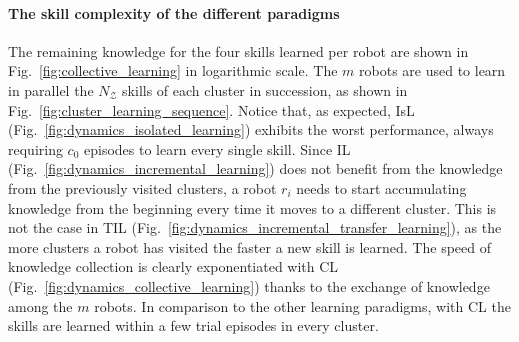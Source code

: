 \documentclass[12pt]{article}
\begin{document}
\paragraph*{The skill complexity of the different paradigms}
The remaining knowledge for the four skills learned per robot are shown in Fig.~\ref{fig:collective_learning} in logarithmic scale. The $m$ robots are used to learn in parallel the $N_\mathcal{Z}$ skills of each cluster in succession, as shown in Fig.~\ref{fig:cluster_learning_sequence}. Notice that, as expected, IsL (Fig.~\ref{fig:dynamics_isolated_learning}) exhibits the worst performance, always requiring $c_0$ episodes to learn every single skill. Since IL (Fig.~\ref{fig:dynamics_incremental_learning}) does not benefit from the knowledge from the previously visited clusters, a robot $r_i$ needs to start accumulating knowledge from the beginning every time it moves to a different cluster. This is not the case in TIL (Fig.~\ref{fig:dynamics_incremental_transfer_learning}), as the more clusters a robot has visited the faster a new skill is learned. The speed of knowledge collection is clearly exponentiated with CL (Fig.~\ref{fig:dynamics_collective_learning}) thanks to the exchange of knowledge among the $m$ robots. In comparison to the other learning paradigms, with CL the skills are learned within a few trial episodes in every cluster. 
\end{document}

